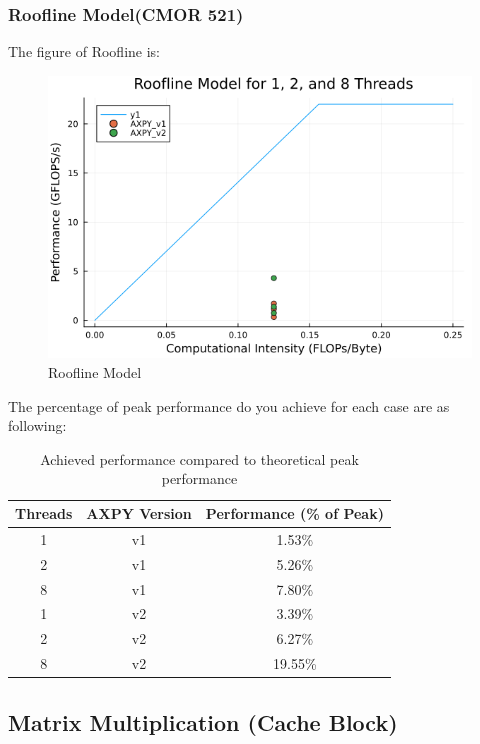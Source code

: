 \documentclass[11pt]{article}
\begin{document}
\subsubsection{Roofline Model(CMOR 521)}
The figure of Roofline is:
\begin{figure}[H]
        \centering
        \includegraphics[width=0.75\linewidth]{Assignments/HW2/docs/images/roofline_plot.png}
        \caption{Roofline Model}
        \label{fig:Roofline Model}
    \end{figure}
The percentage of peak performance do you achieve for each case are as following:
\begin{table}[H]
\centering
\begin{tabular}{ccc}
\toprule
\textbf{Threads} & \textbf{AXPY Version} & \textbf{Performance (\% of Peak)} \\
\midrule
1 & v1 & 1.53\% \\
2 & v1 & 5.26\% \\
8 & v1 & 7.80\% \\
1 & v2 & 3.39\% \\
2 & v2 & 6.27\% \\
8 & v2 & 19.55\% \\
\bottomrule
\end{tabular}
\caption{Achieved performance compared to theoretical peak performance}
\label{tab:performance}
\end{table}

\newpage

\subsection{Matrix Multiplication (Cache Block)}
\end{document}
